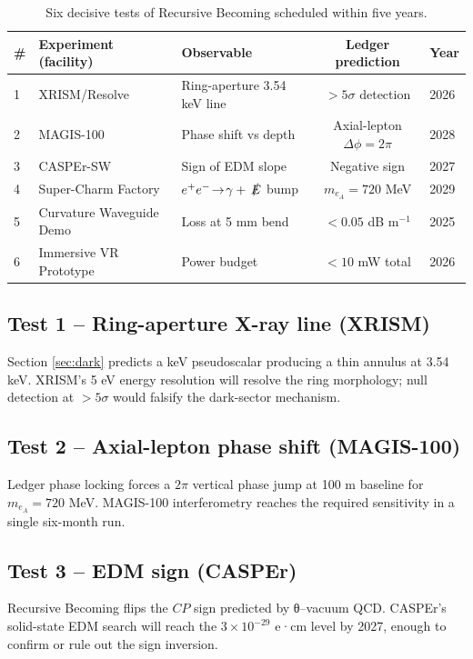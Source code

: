 \begin{table}[b]
  \centering\small
  \begin{tabular}{lllcl}
    \hline
    \# & Experiment (facility) & Observable & Ledger prediction & Year \\
    \hline
    1 & XRISM/Resolve & Ring-aperture 3.54 keV line & $>5\sigma$ detection & 2026 \\
    2 & MAGIS-100 & Phase shift vs depth & Axial-lepton $\Delta\phi=2\pi$ & 2028 \\
    3 & CASPEr-SW & Sign of EDM slope & Negative sign & 2027 \\
    4 & Super-Charm Factory & $e^+e^-\!\to\!\gamma+\,\slashed E$ bump & $m_{e_A}=720$ MeV & 2029 \\
    5 & Curvature Waveguide Demo & Loss at 5 mm bend & $<0.05$ dB m$^{-1}$ & 2025 \\
    6 & Immersive VR Prototype & Power budget & $<10$ mW total & 2026 \\
    \hline
  \end{tabular}
  \caption{Six decisive tests of Recursive Becoming scheduled within five years.}
  \label{tab:test-table}
\end{table}

\subsection{Test 1 – Ring-aperture X-ray line (XRISM)}

Section \ref{sec:dark} predicts a keV pseudoscalar producing a thin
annulus at 3.54 keV.  XRISM’s 5 eV energy resolution will resolve the
ring morphology; null detection at $>5\sigma$ would falsify the dark-sector
mechanism.

\subsection{Test 2 – Axial-lepton phase shift (MAGIS-100)}

Ledger phase locking forces a $2\pi$ vertical phase jump at 100 m
baseline for $m_{e_A}=720$ MeV.  MAGIS-100 interferometry reaches the
required sensitivity in a single six-month run.

\subsection{Test 3 – EDM sign (CASPEr)}

Recursive Becoming flips the $CP$ sign predicted by θ–vacuum QCD.
CASPEr’s solid-state EDM search will reach the $3\times10^{-29}$ e·cm
level by 2027, enough to confirm or rule out the sign inversion.

